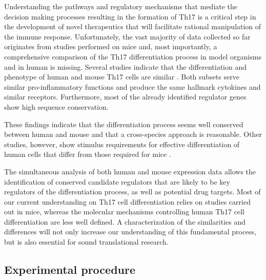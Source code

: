 Understanding the pathways and regulatory mechanisms that mediate the decision making processes resulting in the formation of Th17 is a critical step in the development of novel therapeutics that will facilitate rational manipulation of the immune response.
Unfortunately, the vast majority of data collected so far originates from studies performed on mice \parencite{tuomela2012identification} and, most importantly, a comprehensive comparison of the Th17 differentiation process in model organisms and in human is missing.
Several studies indicate that the differentiation and phenotype of human and mouse Th17 cells are similar \parencite{annunziato2009studies}.
Both subsets serve similar pro-inflammatory functions and produce the same hallmark cytokines and similar receptors.
Furthermore, most of the already identified regulator genes show high sequence conservation.

These findings indicate that the differentiation process seems well conserved between human and mouse and that a cross-species approach is reasonable.
Other studies, however, show stimulus requirements for effective differentiation of human cells that differ from those required for mice \parencites{mcgeachy2008th17}{o2008differentiation}{annunziato2009human}.

The simultaneous analysis of both human and mouse expression data allows the identification of conserved candidate regulators that are likely to be key regulators of the differentiation process, as well as potential drug targets.
Most of our current understanding on Th17 cell differentiation relies on studies carried out in mice, whereas the molecular mechanisms controlling human Th17 cell differentiation are less well defined.
A characterization of the similarities and differences will not only increase our understanding of this fundamental process, but is also essential for sound translational research.

	\subsection{Experimental procedure}

